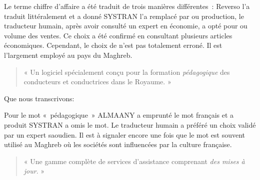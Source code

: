 \documentclass[french]{textolivre}
\begin{document}
Le terme chiffre d’affaire a été traduit de trois manières différentes : Reverso l’a traduit littéralement et a donné  SYSTRAN l’a remplacé par ou production, le traducteur humain, après avoir consulté un expert en économie, a opté pour   ou volume des ventes. Ce choix a été confirmé en consultant plusieurs articles économiques. Cependant, le choix de  n’est pas totalement erroné. Il est l’largement employé au pays du Maghreb.

\begin{quote}
« Un logiciel spécialement conçu pour la formation \emph{pédagogique} des conducteurs et conductrices dans le Royaume. »
\end{quote}

\begin{quote}
\end{quote}

Que nous transcrivons:

\begin{quote}
\end{quote}

Pour le mot « pédagogique » ALMAANY a emprunté le mot français et a produit  SYSTRAN a omis le mot. Le traducteur humain a préféré  un choix validé par un expert saoudien. Il est à signaler encore une fois que le mot  est souvent utilisé au Maghreb où les sociétés sont influencées par la culture française.

\begin{quote}
« Une gamme complète de services d'assistance comprenant \emph{des mises à jour}. »
\end{quote}

\begin{quote}
\end{quote}
\end{document}
